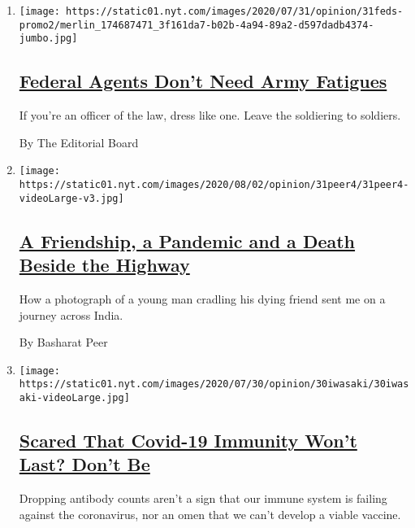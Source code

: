 \begin{enumerate}
\def\labelenumi{\arabic{enumi}.}
\item
  \texttt{[image: https://static01.nyt.com/images/2020/07/31/opinion/31feds-promo2/merlin\_174687471\_3f161da7-b02b-4a94-89a2-d597dadb4374-jumbo.jpg]}

  \hypertarget{federal-agents-dont-need-army-fatigues}{%
  \subsection{\texorpdfstring{\href{/2020/07/31/opinion/federal-agents-trump-uniforms.html}{Federal
  Agents Don't Need Army
  Fatigues}}{Federal Agents Don't Need Army Fatigues}}\label{federal-agents-dont-need-army-fatigues}}

  If you're an officer of the law, dress like one. Leave the soldiering
  to soldiers.

  By The Editorial Board
\item
  \texttt{[image: https://static01.nyt.com/images/2020/08/02/opinion/31peer4/31peer4-videoLarge-v3.jpg]}

  \hypertarget{a-friendship-a-pandemic-and-a-death-beside-the-highway}{%
  \subsection{\texorpdfstring{\href{/2020/07/31/opinion/sunday/India-migration-coronavirus.html}{A
  Friendship, a Pandemic and a Death Beside the
  Highway}}{A Friendship, a Pandemic and a Death Beside the Highway}}\label{a-friendship-a-pandemic-and-a-death-beside-the-highway}}

  How a photograph of a young man cradling his dying friend sent me on a
  journey across India.

  By Basharat Peer
\item
  \texttt{[image: https://static01.nyt.com/images/2020/07/30/opinion/30iwasaki/30iwasaki-videoLarge.jpg]}

  \hypertarget{scared-that-covid-19-immunity-wont-last-dont-be}{%
  \subsection{\texorpdfstring{\href{/2020/07/31/opinion/coronavirus-antibodies-immunity.html}{Scared
  That Covid-19 Immunity Won't Last? Don't
  Be}}{Scared That Covid-19 Immunity Won't Last? Don't Be}}\label{scared-that-covid-19-immunity-wont-last-dont-be}}

  Dropping antibody counts aren't a sign that our immune system is
  failing against the coronavirus, nor an omen that we can't develop a
  viable vaccine.


\end{enumerate}

